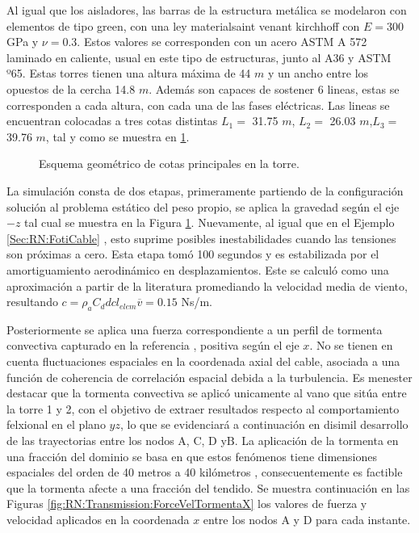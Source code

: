 Al igual que los aisladores, las barras de la estructura metálica se modelaron con elementos de tipo green, con una ley materialsaint venant kirchhoff con $E= 300$ GPa y $\nu=0.3$. Estos valores se corresponden con un acero  ASTM A 572 laminado en caliente, usual en este tipo de estructuras, junto al A36 y ASTM º65. Estas torres tienen una altura máxima de 44 $m$ y un ancho entre los opuestos de la cercha 14.8 $m$. Además son capaces de sostener 6 lineas, estas se corresponden a cada altura, con cada una de las fases eléctricas. Las lineas se encuentran colocadas a tres cotas distintas $L_1=$ 31.75 $m$, $L_2=$ 26.03 $m$,$L_3=$ 39.76 $m$, tal y como se muestra en \ref{fig:RN:Transmission:Torre}. 

\begin{figure}[h]
	\centering
	\def\svgwidth{80mm}
	
	\caption{Esquema geométrico de cotas principales en la torre. }
	\label{fig:RN:Transmission:Torre}
\end{figure}

La simulación consta de dos etapas, primeramente partiendo de la configuración solución al problema estático del peso propio, se aplica la gravedad según el eje $-z$ tal cual se muestra en la Figura \ref{fig:RN:Transmission:Torre}. Nuevamente, al igual que en el Ejemplo \ref{Sec:RN:FotiCable} , esto suprime posibles inestabilidades cuando las tensiones son próximas a cero. Esta etapa tomó 100 segundos y es estabilizada por el amortiguamiento aerodinámico en desplazamientos. Este se calculó como una aproximación a partir de la literatura \cite{matheson1981simulation} promediando la velocidad media de viento, resultando $c=\rho_a C_d dc l_{elem} \overline{v}=0.15$ Ns/m.

 Posteriormente se aplica una fuerza correspondiente a un perfil de tormenta convectiva capturado en la referencia \citet{Stengel2017a}, positiva según el eje $x$. No se tienen en cuenta fluctuaciones espaciales en la coordenada axial del cable, asociada a una función de coherencia de correlación espacial debida a la turbulencia. Es menester destacar que la tormenta convectiva se aplicó unicamente al vano que sitúa entre la torre 1 y 2, con el objetivo de extraer resultados respecto al comportamiento felxional en el plano $yz$, lo que se evidenciará a continuación en disimil desarrollo de las trayectorias entre los nodos $\text{A}$, $\text{C}$, $\text{D}$ y$\text{B}$. La aplicación de la tormenta en una fracción del dominio se basa en que estos fenómenos tiene dimensiones espaciales del orden de 40 metros a 40 kilómetros \textcite{fujita1985downburst}, consecuentemente es factible que la tormenta afecte a una fracción del tendido. Se muestra continuación en las Figuras \ref{fig:RN:Transmission:ForceVelTormentaX} los valores de fuerza y velocidad aplicados en la coordenada $x$ entre los nodos A y D para cada instante.

